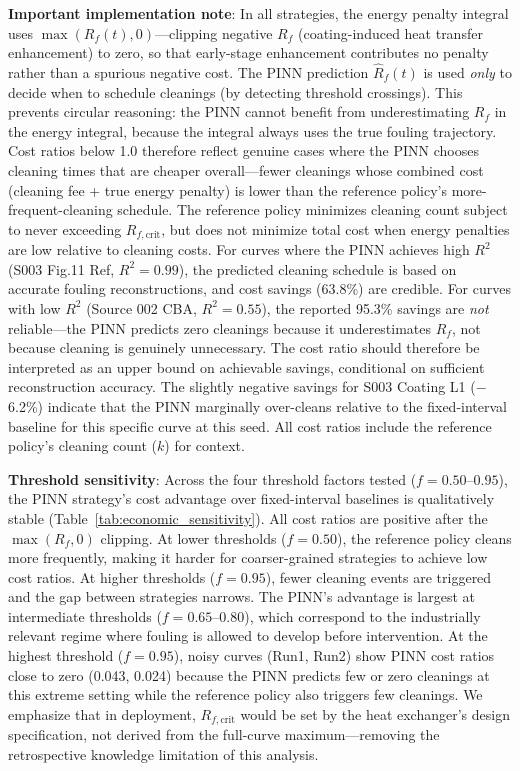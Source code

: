 \documentclass[review]{elsarticle}
\begin{document}
\textbf{Important implementation note}: In all strategies, the energy penalty integral uses $\max(R_f(t), 0)$---clipping negative $R_f$ (coating-induced heat transfer enhancement) to zero, so that early-stage enhancement contributes no penalty rather than a spurious negative cost. The PINN prediction $\hat{R}_f(t)$ is used \textit{only} to decide when to schedule cleanings (by detecting threshold crossings). This prevents circular reasoning: the PINN cannot benefit from underestimating $R_f$ in the energy integral, because the integral always uses the true fouling trajectory. Cost ratios below 1.0 therefore reflect genuine cases where the PINN chooses cleaning times that are cheaper overall---fewer cleanings whose combined cost (cleaning fee + true energy penalty) is lower than the reference policy's more-frequent-cleaning schedule. The reference policy minimizes cleaning count subject to never exceeding $R_{f,\text{crit}}$, but does not minimize total cost when energy penalties are low relative to cleaning costs. For curves where the PINN achieves high $R^2$ (S003 Fig.11 Ref, $R^2=0.99$), the predicted cleaning schedule is based on accurate fouling reconstructions, and cost savings (63.8\%) are credible. For curves with low $R^2$ (Source 002 CBA, $R^2=0.55$), the reported 95.3\% savings are \textit{not} reliable---the PINN predicts zero cleanings because it underestimates $R_f$, not because cleaning is genuinely unnecessary. The cost ratio should therefore be interpreted as an upper bound on achievable savings, conditional on sufficient reconstruction accuracy. The slightly negative savings for S003 Coating L1 ($-$6.2\%) indicate that the PINN marginally over-cleans relative to the fixed-interval baseline for this specific curve at this seed. All cost ratios include the reference policy's cleaning count ($k$) for context.

\textbf{Threshold sensitivity}: Across the four threshold factors tested ($f = 0.50$--$0.95$), the PINN strategy's cost advantage over fixed-interval baselines is qualitatively stable (Table~\ref{tab:economic_sensitivity}). All cost ratios are positive after the $\max(R_f, 0)$ clipping. At lower thresholds ($f=0.50$), the reference policy cleans more frequently, making it harder for coarser-grained strategies to achieve low cost ratios. At higher thresholds ($f=0.95$), fewer cleaning events are triggered and the gap between strategies narrows. The PINN's advantage is largest at intermediate thresholds ($f=0.65$--$0.80$), which correspond to the industrially relevant regime where fouling is allowed to develop before intervention. At the highest threshold ($f=0.95$), noisy curves (Run1, Run2) show PINN cost ratios close to zero (0.043, 0.024) because the PINN predicts few or zero cleanings at this extreme setting while the reference policy also triggers few cleanings. We emphasize that in deployment, $R_{f,\text{crit}}$ would be set by the heat exchanger's design specification, not derived from the full-curve maximum---removing the retrospective knowledge limitation of this analysis.
\end{document}
